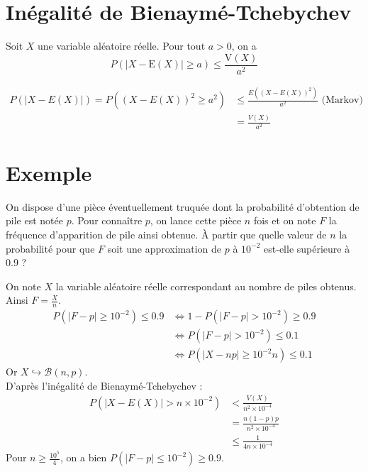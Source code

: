 \documentclass[../main.tex]{subfiles}
\begin{document}
\section{Inégalité de Bienaymé-Tchebychev}
\begin{tcolorbox}[title=Théorème 33.19, title filled=false, colframe=orange, colback=orange!10!white]
    Soit $X$ une variable aléatoire réelle. Pour tout $a>0$, on a
    $$P(|X-\mathrm{E}(X)| \geq a) \leq \frac{\mathrm{V}(X)}{a^2}$$
\end{tcolorbox}

\begin{align*}
    P(|X - E(X)|) = P((X - E(X))^2 \geq a^2) &\leq \frac{E((X-E(X))^2)}{a^2} \text{ (Markov)} \\
    &= \frac{V(X)}{a^2}
\end{align*}

\section{Exemple}
\begin{tcolorbox}[title=Exemple 33.20, title filled=false, colframe=darkgreen, colback=darkgreen!10!white]
    On dispose d'une pièce éventuellement truquée dont la probabilité d'obtention de pile est notée $p$. Pour connaître $p$, on lance cette pièce $n$ fois et on note $F$ la fréquence d'apparition de pile ainsi obtenue. À partir que quelle valeur de $n$ la probabilité pour que $F$ soit une approximation de $p$ à $10^{-2}$ est-elle supérieure à $0.9$ ?
\end{tcolorbox}

\noindent On note $X$ la variable aléatoire réelle correspondant au nombre de piles obtenus. \\
Ainsi $F = \frac{X}{n}$. 
\begin{align*}
    P(|F - p| \geq 10^{-2}) \leq 0.9 &\Leftrightarrow 1 - P(|F - p| > 10^{-2}) \geq 0.9 \\
    &\Leftrightarrow P(|F - p| > 10^{-2}) \leq 0.1 \\
    &\Leftrightarrow P(|X - np| \geq 10^{-2} n) \leq 0.1
\end{align*}
Or $X\hookrightarrow \mathcal{B}(n, p)$. \\
D'après l'inégalité de Bienaymé-Tchebychev :
\begin{align*}
    P(|X - E(X)| > n \times 10^{-2}) &< \frac{V(X)}{n^2\times 10^{-4}} \\
    &= \frac{n(1-p)p}{n^2\times 10^{-4}} \\
    &\leq \frac{1}{4n\times 10^{-4}}
\end{align*}
Pour $n\geq \frac{10^5}{4}$, on a bien $P(|F-p|\leq 10^{-2}) \geq 0.9$.
\end{document}
